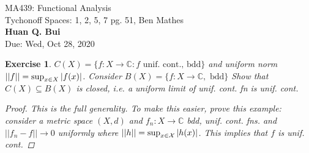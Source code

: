 \documentclass[11pt]{article}
\newtheorem{exercise}{Exercise}
\newcommand{\X}{\mathcal{X}}
\begin{document}
\begin{center}
\begin{framed}
{\Large  MA439: Functional Analysis\\
	 Tychonoff Spaces: 1, 2, 5, 7 pg. 51, Ben Mathes}\\
$\,$\\
{\Large \bf  Huan Q. Bui\\}
$\,$\\
{\Large Due: Wed, Oct 28, 2020}
\end{framed}
\end{center}



\begin{exercise}
	$C(X) = \{ f: X\to \mathbb{C} : f \text{ unif. cont., bdd} \}$ and uniform norm $|| f || = \sup_{x\in X} \abs{f(x)}$. Consider $B(X) = \{ f: X\to \mathbb{C}, \text{ bdd} \}$ Show that $C(X) \subseteq B(X)$ is closed, i.e. a uniform limit of unif. cont. fn is unif. cont.
	\begin{proof}
		This is the full generality. To make this easier, prove this example: consider a metric space $(X,d)$ and $f_n: X\to \mathbb{C}$ bdd, unif. cont. fns. and $|| f_n -f || \to 0$ uniformly where $|| h || = \sup_{x\in \X}\abs{h(x)}$. This implies that $f$ is unif. cont.  
	\end{proof}
\end{exercise}
\end{document}
